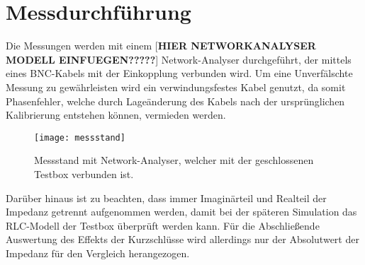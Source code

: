 \newpage


\section{Messdurchf\"uhrung}
Die Messungen werden mit einem [\textbf{HIER NETWORKANALYSER MODELL EINFUEGEN?????}] Network-Analyser durchgef\"uhrt, der mittels eines BNC-Kabels mit der Einkopplung verbunden wird. Um eine Unverf\"alschte Messung zu gew\"ahrleisten wird ein verwindungsfestes Kabel genutzt, da somit Phasenfehler, welche durch Lage\"anderung des Kabels nach der urspr\"unglichen Kalibrierung entstehen k\"onnen, vermieden werden.
\par
\begin{figure}[htb]
	\centering
	\texttt{[image: messstand]}
	\caption{Messstand mit Network-Analyser, welcher mit der geschlossenen Testbox verbunden ist.}
	\label{fig:messstand}
\end{figure}

Dar\"uber hinaus ist zu beachten, dass immer Imagin\"arteil und Realteil der Impedanz getrennt aufgenommen werden, damit bei der sp\"ateren Simulation das RLC-Modell der Testbox \"uberpr\"uft werden kann. F\"ur die Abschlie\ss{}ende Auswertung des Effekts der Kurzschl\"usse wird allerdings nur der Absolutwert der Impedanz f\"ur den Vergleich herangezogen.
